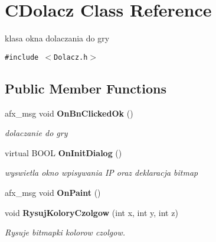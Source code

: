 \section{CDolacz Class Reference}
\label{class_c_dolacz}
klasa okna dolaczania do gry  


{\tt \#include $<$Dolacz.h$>$}

\subsection*{Public Member Functions}
\begin{CompactItemize}
\item 
afx\_\-msg void {\bf OnBnClickedOk} ()
\begin{CompactList}\small\item\em dolaczanie do gry \item\end{CompactList}\item 
virtual BOOL {\bf OnInitDialog} ()
\begin{CompactList}\small\item\em wyswietla okno wpisywania IP oraz deklaracja bitmap \item\end{CompactList}\item 
afx\_\-msg void {\bf OnPaint} ()
\item 
void {\bf RysujKoloryCzolgow} (int x, int y, int z)\label{class_c_dolacz_b2fd508093af505ac56a8e481608b673}

\begin{CompactList}\small\item\em Rysuje bitmapki kolorow czolgow. \item\end{CompactList}\end{CompactItemize}
